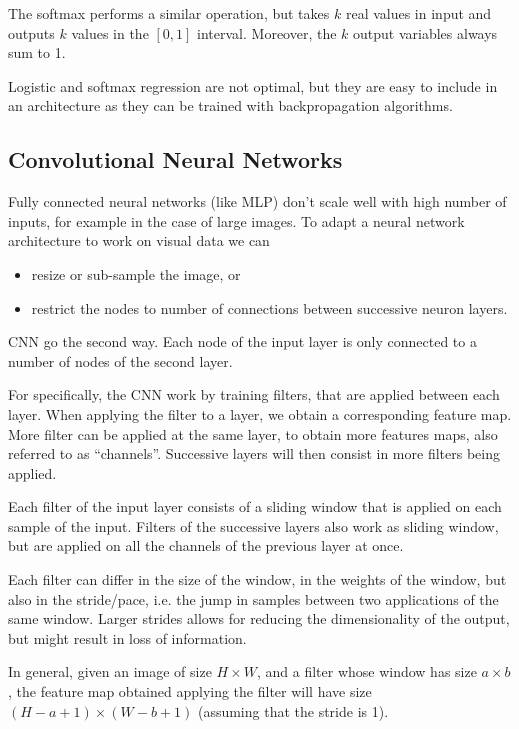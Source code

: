 \documentclass[oneside,onecolumn]{report}
\begin{document}
The softmax performs a similar operation, but takes $k$ real values in input and outputs $k$ values in the $[0,1]$ interval.
Moreover, the $k$ output variables always sum to 1.

Logistic and softmax regression are not optimal, but they are easy to include in an architecture as they can be trained with backpropagation algorithms.




\subsection{Convolutional Neural Networks}
Fully connected neural networks (like MLP) don't scale well with high number of inputs, for example in the case of large images.
To adapt a neural network architecture to work on visual data we can
\begin{itemize}
    \item resize or sub-sample the image, or
    \item restrict the nodes to number of connections between successive neuron layers.
\end{itemize}

CNN go the second way.
Each node of the input layer is only connected to a number of nodes of the second layer.

For specifically, the CNN work by training filters, that are applied between each layer.
When applying the filter to a layer, we obtain a corresponding feature map.
More filter can be applied at the same layer, to obtain more features maps, also referred to as ``channels''.
Successive layers will then consist in more filters being applied.

Each filter of the input layer consists of a sliding window that is applied on each sample of the input.
Filters of the successive layers also work as sliding window, but are applied on all the channels of the previous layer at once.

Each filter can differ in the size of the window, in the weights of the window, but also in the stride/pace, i.e. the jump in samples between two applications of the same window.
Larger strides allows for reducing the dimensionality of the output, but might result in loss of information.

In general, given an image of size $H \times W$, and a filter whose window has size $a \times b$, the feature map obtained applying the filter will have size $(H - a + 1) \times (W - b + 1)$ (assuming that the stride is 1).
\end{document}
